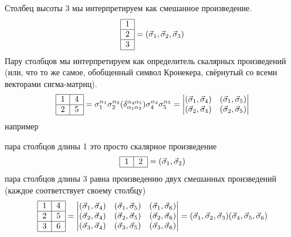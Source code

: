 \documentclass[]{article}
\renewcommand{\[}{\begin{equation}}
\renewcommand{\]}{\end{equation}}
\begin{document}
Столбец высоты 3 мы интерпретируем как смешанное произведение.
\[
\begin{tabular}{ | l | }
\hline
1 \\ \hline
2 \\ \hline
3 \\
\hline
\end{tabular} = (\vec \sigma_1, \vec \sigma_2, \vec \sigma_3) 
\label{k4}
\]
Пару столбцов мы интерпретируем как определитель скалярных произведений (или, что то же самое, обобщенный символ Кронекера\cite{kronecker_wiki}, свёрнутый со всеми векторами сигма-матриц).
\[
\begin{tabular}{ |l|l| }
\hline
1 & 4 \\ \hline
2 & 5\\ 
\hline
\end{tabular}
 =
 \sigma_1^{\alpha_1} \sigma_2^{\alpha_2} 
 (\delta_{\alpha_1\alpha_2}^{\alpha_4\alpha_5})
 \sigma_4^{\alpha_4} \sigma_5^{\alpha_5} 
 =
\begin{vmatrix}
(\vec\sigma_1,\vec\sigma_4) & (\vec\sigma_1,\vec\sigma_5)\\
(\vec\sigma_2,\vec\sigma_4) & (\vec\sigma_2,\vec\sigma_5)\\
\end{vmatrix}
\label{k5}
\]
например

пара столбцов длины 1 это просто скалярное произведение
\[
\begin{tabular}{ |l|l| }
\hline
1 & 2 \\
\hline
\end{tabular}
= (\vec \sigma_1, \vec \sigma_2)
\label{k6}
\]
пара столбцов длины 3 равна произведению двух смешанных произведений (каждое соответствует  своему столбцу)
\[
\begin{tabular}{ |l|l| }
\hline
1 & 4 \\ \hline
2 & 5\\ \hline
3 & 6\\
\hline
\end{tabular}
= 
\begin{vmatrix}
(\vec\sigma_1,\vec\sigma_4) & (\vec\sigma_1,\vec\sigma_5) & (\vec\sigma_1,\vec\sigma_6) \\
(\vec\sigma_2,\vec\sigma_4) & (\vec\sigma_2,\vec\sigma_5) & (\vec\sigma_2,\vec\sigma_6) \\
(\vec\sigma_3,\vec\sigma_4) & (\vec\sigma_3,\vec\sigma_5) & (\vec\sigma_3,\vec\sigma_6) \\
\end{vmatrix}
=
(\vec \sigma_1, \vec \sigma_2, \vec \sigma_3)
(\vec \sigma_4, \vec \sigma_5, \vec \sigma_6)
\label{k7}
\]
\end{document}
